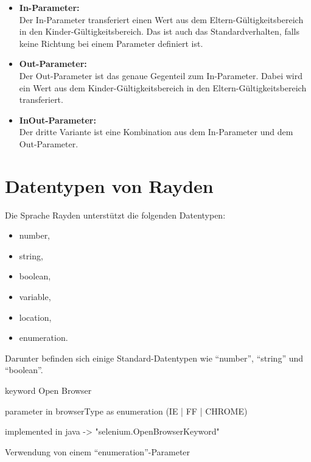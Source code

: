 \begin{itemize}
\item \textbf{In-Parameter:}\\
Der In-Parameter transferiert einen Wert aus dem Eltern-Gültigkeitsbereich in den Kinder-Gültigkeitsbereich. Das ist auch das Standardverhalten, falls keine Richtung bei einem Parameter definiert ist.\\

\item \textbf{Out-Parameter:}\\
Der Out-Parameter ist das genaue Gegenteil zum In-Parameter. Dabei wird ein Wert aus dem Kinder-Gültigkeitsbereich in den Eltern-Gültigkeitsbereich transferiert. \\

\item \textbf{InOut-Parameter:}\\
Der dritte Variante ist eine Kombination aus dem In-Parameter und dem Out-Parameter.\\
\end{itemize}

\section{Datentypen von Rayden}

Die Sprache Rayden unterstützt die folgenden Datentypen:

\begin{itemize}
\item number,
\item string,
\item boolean,
\item variable,
\item location,
\item enumeration.
\end{itemize}

\SuperPar
Darunter befinden sich einige Standard-Datentypen wie "`number"', "`string"' und "`boolean"'. 

\begin{program}
\begin{JavaCode}
keyword Open Browser { 
	parameter in browserType as enumeration (IE | FF | CHROME)

	implemented in java -> "selenium.OpenBrowserKeyword"
}
\end{JavaCode}
\caption{Verwendung von einem "`enumeration"'-Parameter}
\label{prog:enum}
\end{program}

